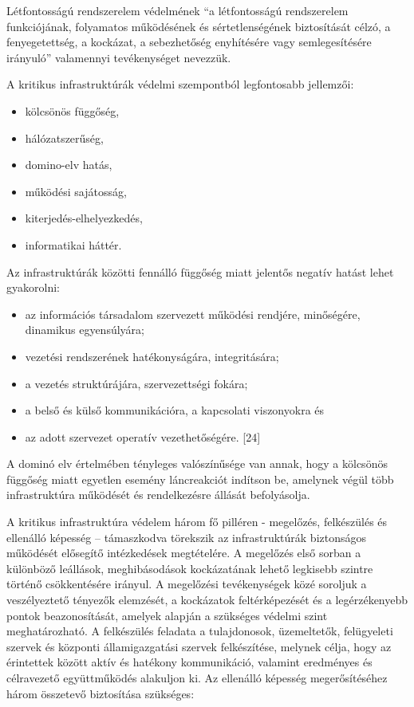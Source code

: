 \documentclass[12pt,magyar,a4paper,oneside]{scrreprt}
\providecommand{\tightlist}{%
  \setlength{\itemsep}{0pt}\setlength{\parskip}{0pt}}
\begin{document}
Létfontosságú rendszerelem védelmének ``a létfontosságú rendszerelem
funkciójának, folyamatos működésének és sértetlenségének biztosítását
célzó, a fenyegetettség, a kockázat, a sebezhetőség enyhítésére vagy
semlegesítésére irányuló'' valamennyi tevékenységet nevezzük.

A kritikus infrastruktúrák védelmi szempontból legfontosabb jellemzői:

\begin{itemize}
\tightlist
\item
  kölcsönös függőség,
\item
  hálózatszerűség,
\item
  domino-elv hatás,
\item
  működési sajátosság,
\item
  kiterjedés-elhelyezkedés,
\item
  informatikai háttér.
\end{itemize}

Az infrastruktúrák közötti fennálló függőség miatt jelentős negatív
hatást lehet gyakorolni:

\begin{itemize}
\tightlist
\item
  az információs társadalom szervezett működési rendjére, minőségére,
  dinamikus egyensúlyára;
\item
  vezetési rendszerének hatékonyságára, integritására;
\item
  a vezetés struktúrájára, szervezettségi fokára;
\item
  a belső és külső kommunikációra, a kapcsolati viszonyokra és
\item
  az adott szervezet operatív vezethetőségére. {[}24{]}
\end{itemize}

A dominó elv értelmében tényleges valószínűsége van annak, hogy a
kölcsönös függőség miatt egyetlen esemény láncreakciót indítson be,
amelynek végül több infrastruktúra működését és rendelkezésre állását
befolyásolja.

A kritikus infrastruktúra védelem három fő pilléren - megelőzés,
felkészülés és ellenálló képesség -- támaszkodva törekszik az
infrastruktúrák biztonságos működését elősegítő intézkedések
megtételére. A megelőzés első sorban a különböző leállások,
meghibásodások kockázatának lehető legkisebb szintre történő
csökkentésére irányul. A megelőzési tevékenységek közé soroljuk a
veszélyeztető tényezők elemzését, a kockázatok feltérképezését és a
legérzékenyebb pontok beazonosítását, amelyek alapján a szükséges
védelmi szint meghatározható. A felkészülés feladata a tulajdonosok,
üzemeltetők, felügyeleti szervek és központi államigazgatási szervek
felkészítése, melynek célja, hogy az érintettek között aktív és hatékony
kommunikáció, valamint eredményes és célravezető együttműködés alakuljon
ki. Az ellenálló képesség megerősítéséhez három összetevő biztosítása
szükséges:
\end{document}
